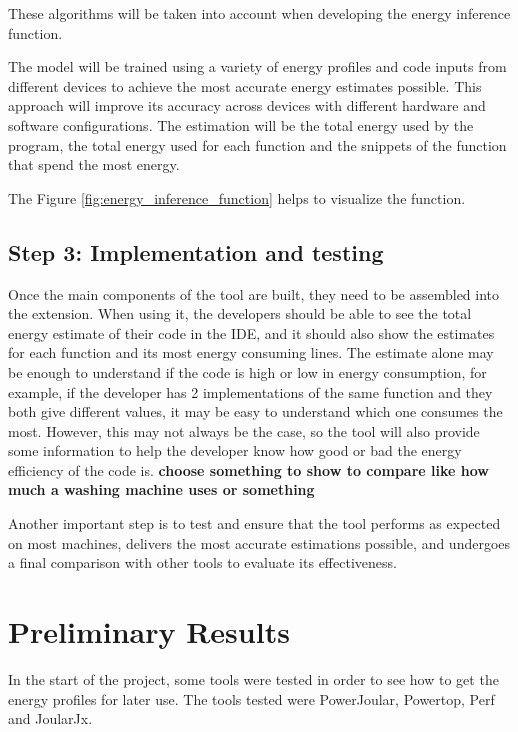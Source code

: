 \documentclass[sigplan]{acmart}
\begin{document}
These algorithms will be taken into account when developing the energy inference function.

The model will be trained using a variety of energy profiles and code inputs from different devices to achieve the most accurate energy estimates possible. This approach will improve its accuracy across devices with different hardware and software configurations.
The estimation will be the total energy used by the program, the total energy used for each function and the snippets of the function that spend the most energy.

The Figure \ref{fig:energy_inference_function} helps to visualize the function.

\subsection{Step 3: Implementation and testing} \label{sec:work_step3_implementation_and_testing}

Once the main components of the tool are built, they need to be assembled into the extension. When using it, the developers should be able to see the total energy estimate of their code in the IDE, and it should also show the estimates for each function and its most energy consuming lines.
The estimate alone may be enough to understand if the code is high or low in energy consumption, for example, if the developer has 2 implementations of the same function and they both give different values, it may be easy to understand which one consumes the most. However, this may not always be the case, so the tool will also provide some information to help the developer know how good or bad the energy efficiency of the code is. \textbf{choose something to show to compare like how much a washing machine uses or something}

Another important step is to test and ensure that the tool performs as expected on most machines, delivers the most accurate estimations possible, and undergoes a final comparison with other tools to evaluate its effectiveness.

\section{Preliminary Results} \label{sec:preliminaryresults}

In the start of the project, some tools were tested in order to see how to get the energy profiles for later use. The tools tested were PowerJoular, Powertop, Perf and JoularJx.
\end{document}
